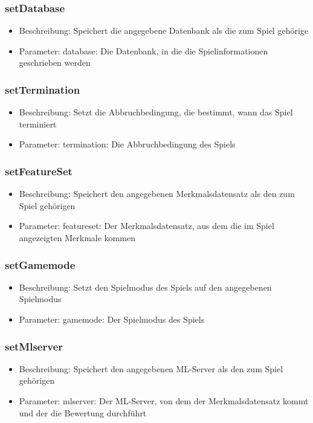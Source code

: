 \documentclass[a4paper]{scrreprt}
\begin{document}
	\subsubsection{setDatabase}
		\begin{itemize}
		\item Beschreibung: Speichert die angegebene Datenbank als die zum Spiel gehörige
		\item Parameter: database: Die Datenbank, in die die Spielinformationen geschrieben werden
		\end{itemize}
	\subsubsection{setTermination}
		\begin{itemize}
		\item Beschreibung: Setzt die Abbruchbedingung, die bestimmt, wann das Spiel terminiert
		\item Parameter: termination: Die Abbruchbedingung des Spiels
		\end{itemize}
	\subsubsection{setFeatureSet}
				\begin{itemize}
				\item Beschreibung: Speichert den angegebenen Merkmalsdatensatz als den zum Spiel gehörigen
				\item Parameter: featureset: Der Merkmalsdatensatz, aus dem die im Spiel angezeigten Merkmale kommen
				\end{itemize}
	\subsubsection{setGamemode}
		\begin{itemize}
		\item Beschreibung: Setzt den Spielmodus des Spiels auf den angegebenen Spielmodus
		\item Parameter: gamemode: Der Spielmodus des Spiels
		\end{itemize}	
	\subsubsection{setMlserver}
		\begin{itemize}
		\item Beschreibung: Speichert den angegebenen ML-Server als den zum Spiel gehörigen
		\item Parameter: mlserver: Der ML-Server, von dem der Merkmalsdatensatz kommt und der die Bewertung durchführt
		\end{itemize}
\end{document}
